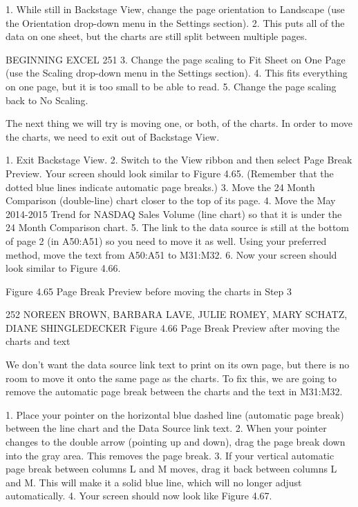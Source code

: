 1. While still in Backstage View, change the page orientation to Landscape (use the Orientation
drop-down menu in the Settings section).
2. This puts all of the data on one sheet, but the charts are still split between multiple pages.

BEGINNING EXCEL 251
3. Change the page scaling to Fit Sheet on One Page (use the Scaling drop-down menu in the
Settings section).
4. This fits everything on one page, but it is too small to be able to read.
5. Change the page scaling back to No Scaling.

The next thing we will try is moving one, or both, of the charts. In order to move the charts, we need
to exit out of Backstage View.

1. Exit Backstage View.
2. Switch to the View ribbon and then select Page Break Preview. Your screen should look similar
to Figure 4.65. (Remember that the dotted blue lines indicate automatic page breaks.)
3. Move the 24 Month Comparison (double-line) chart closer to the top of its page.
4. Move the May 2014-2015 Trend for NASDAQ Sales Volume (line chart) so that it is under the
24 Month Comparison chart.
5. The link to the data source is still at the bottom of page 2 (in A50:A51) so you need to move it as
well. Using your preferred method, move the text from A50:A51 to M31:M32.
6. Now your screen should look similar to Figure 4.66.




Figure 4.65 Page Break Preview before moving the charts in Step 3



252 NOREEN BROWN, BARBARA LAVE, JULIE ROMEY, MARY SCHATZ, DIANE SHINGLEDECKER
Figure 4.66 Page Break Preview after moving the charts and text


We don’t want the data source link text to print on its own page, but there is no room to move it onto
the same page as the charts. To fix this, we are going to remove the automatic page break between the
charts and the text in M31:M32.

1. Place your pointer on the horizontal blue dashed line (automatic page break) between the line
chart and the Data Source link text.
2. When your pointer changes to the double arrow (pointing up and down), drag the page break
down into the gray area. This removes the page break.
3. If your vertical automatic page break between columns L and M moves, drag it back between
columns L and M. This will make it a solid blue line, which will no longer adjust automatically.
4. Your screen should now look like Figure 4.67.





